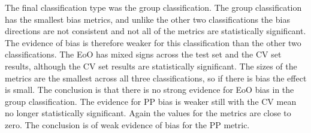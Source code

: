 The final classification type was the group classification. The group classification has the smallest bias metrics, and unlike the other two classifications the bias directions are not consistent and not all of the metrics are statistically significant. The evidence of bias is therefore weaker for this classification than the other two classifications. The EoO has mixed signs across the test set and the CV set results, although the CV set results are statistically significant. The sizes of the metrics are the smallest across all three classifications, so if there is bias the effect is small. The conclusion is that there is no strong evidence for EoO bias in the group classification. The evidence for PP bias is weaker still with the CV mean no longer statistically significant. Again the values for the metrics are close to zero. The conclusion is of weak evidence of bias for the PP metric.



